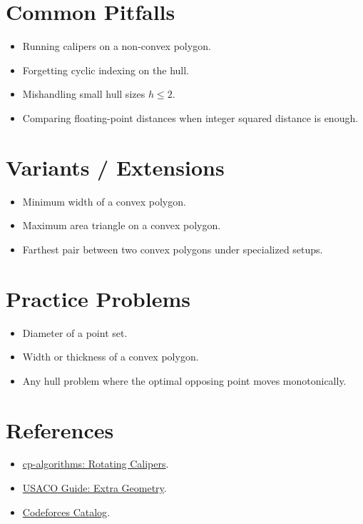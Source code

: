 \section*{Common Pitfalls}

\begin{itemize}
  \item Running calipers on a non-convex polygon.
  \item Forgetting cyclic indexing on the hull.
  \item Mishandling small hull sizes \(h \le 2\).
  \item Comparing floating-point distances when integer squared distance is enough.
\end{itemize}

\section*{Variants / Extensions}

\begin{itemize}
  \item Minimum width of a convex polygon.
  \item Maximum area triangle on a convex polygon.
  \item Farthest pair between two convex polygons under specialized setups.
\end{itemize}

\section*{Practice Problems}

\begin{itemize}
  \item Diameter of a point set.
  \item Width or thickness of a convex polygon.
  \item Any hull problem where the optimal opposing point moves monotonically.
\end{itemize}

\section*{References}

\begin{itemize}
  \item \href{https://cp-algorithms.com/geometry/rotating_calipers.html}{cp-algorithms: Rotating Calipers}.
  \item \href{https://usaco.guide/plat/geo-ext}{USACO Guide: Extra Geometry}.
  \item \href{https://codeforces.com/catalog}{Codeforces Catalog}.
\end{itemize}
